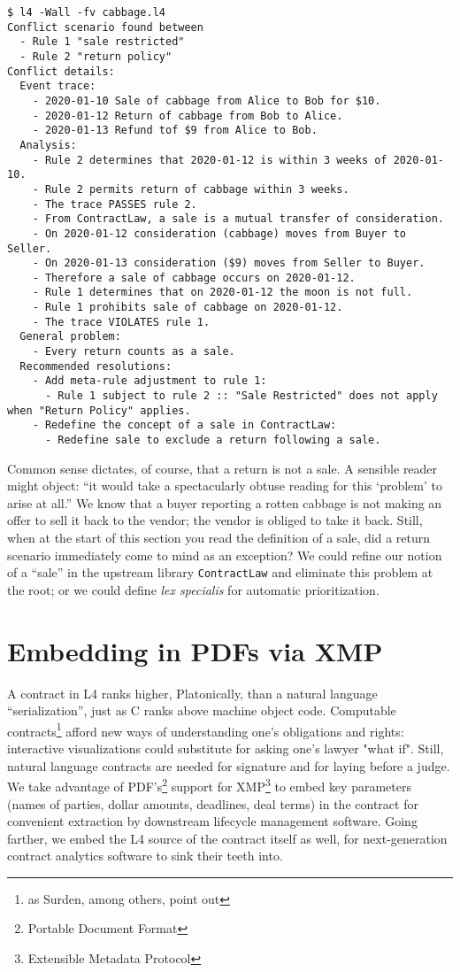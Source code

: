 \documentclass{IOS-Book-Article}
\begin{document}
\begin{lstlisting}
$ l4 -Wall -fv cabbage.l4
Conflict scenario found between
  - Rule 1 "sale restricted"
  - Rule 2 "return policy"
Conflict details:
  Event trace:
    - 2020-01-10 Sale of cabbage from Alice to Bob for $10.
    - 2020-01-12 Return of cabbage from Bob to Alice.
    - 2020-01-13 Refund tof $9 from Alice to Bob.
  Analysis:
    - Rule 2 determines that 2020-01-12 is within 3 weeks of 2020-01-10.
    - Rule 2 permits return of cabbage within 3 weeks.
    - The trace PASSES rule 2.
    - From ContractLaw, a sale is a mutual transfer of consideration.
    - On 2020-01-12 consideration (cabbage) moves from Buyer to Seller.
    - On 2020-01-13 consideration ($9) moves from Seller to Buyer.
    - Therefore a sale of cabbage occurs on 2020-01-12.
    - Rule 1 determines that on 2020-01-12 the moon is not full.
    - Rule 1 prohibits sale of cabbage on 2020-01-12.
    - The trace VIOLATES rule 1.
  General problem:
    - Every return counts as a sale.
  Recommended resolutions:
    - Add meta-rule adjustment to rule 1:
      - Rule 1 subject to rule 2 :: "Sale Restricted" does not apply when "Return Policy" applies.
    - Redefine the concept of a sale in ContractLaw:
      - Redefine sale to exclude a return following a sale.
\end{lstlisting}

\noindent Common sense dictates, of course, that a return is not a sale. A sensible reader might object: ``it would take a spectacularly obtuse reading for this `problem' to arise at all.'' We know that a buyer reporting a rotten cabbage is not making an offer to sell it back to the vendor; the vendor is obliged to take it back. Still, when at the start of this section you read the definition of a sale, did a return scenario immediately come to mind as an exception? We could refine our notion of a ``sale'' in the upstream library \texttt{ContractLaw} and eliminate this problem at the root; or we could define \textit{lex specialis} for automatic prioritization.

\section{Embedding in PDFs via XMP}

A contract in L4 ranks higher, Platonically, than a natural language ``serialization'', just as C ranks above machine object code. Computable contracts\footnote{as Surden, among others, point out} afford new ways of understanding one's obligations and rights: interactive visualizations could substitute for asking one's lawyer "what if". Still, natural language contracts are needed for signature and for laying before a judge. We take advantage of PDF's\footnote{Portable Document Format} support for XMP\footnote{Extensible Metadata Protocol} to embed key parameters (names of parties, dollar amounts, deadlines, deal terms) in the contract for convenient extraction by downstream lifecycle management software. Going farther, we embed the L4 source of the contract itself as well, for next-generation contract analytics software to sink their teeth into.
\end{document}
